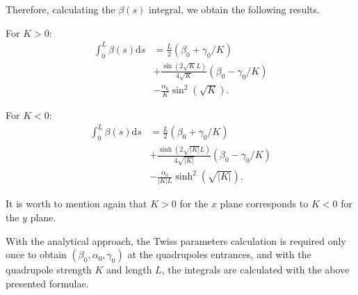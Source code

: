 Therefore, calculating the $\beta(s)$ integral, we obtain the following results.

For $K > 0$:
\begin{align*}
    \int_{0}^{L} \beta(s) \mathrm{d}s &= \frac{L}{2}\left(\beta_0 + \gamma_0/K\right) \\
    &+ \frac{\sin\left(2\sqrt{K}L\right)}{4 \sqrt{K}}\left(\beta_0 - \gamma_0/K\right) \\
    &- \frac{\alpha_0}{K}\sin^2\left(\sqrt{K}\right).
\end{align*}

For $K < 0$:
\begin{align*}
    \int_{0}^{L} \beta(s) \mathrm{d}s &= \frac{L}{2}\left(\beta_0 + \gamma_0/K\right)  \\ 
    &+ \frac{\sinh\left(2\sqrt{|K|}L\right)}{4 \sqrt{|K|}}\left(\beta_0 - \gamma_0/K\right) \\
    &- \frac{\alpha_0}{|K|L}\sinh^2\left(\sqrt{|K|}\right).
\end{align*}

It is worth to mention again that $K > 0$ for the $x$ plane corresponds to $K < 0$ for the $y$ plane. 

With the analytical approach, the Twiss parameters calculation is required only once to obtain $(\beta_0, \alpha_0, \gamma_0)$ at the quadrupoles entrances, and with the quadrupole strength $K$ and length $L$, the integrals are calculated with the above presented formulae.